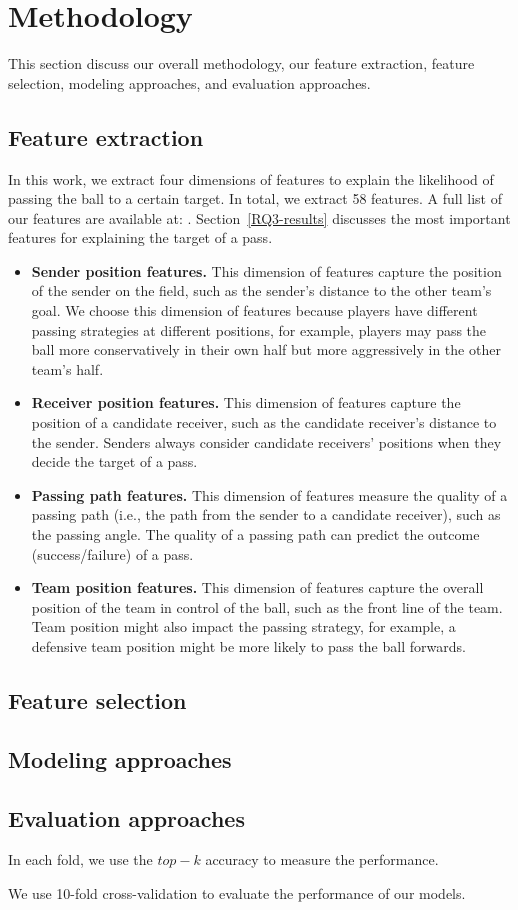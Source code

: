 \section{Methodology} \label{methodology}
This section discuss our overall methodology, our feature extraction, feature selection, modeling approaches, and evaluation approaches.

\subsection{Feature extraction}

In this work, we extract four dimensions of features to explain the likelihood of passing the ball to a certain target. In total, we extract 58 features. A full list of our features are available at: . Section~\ref{RQ3-results} discusses the most important features for explaining the target of a pass.
\begin{itemize}
	\item \textbf{Sender position features.} This dimension of features capture the position of the sender on the field, such as the sender's distance to the other team's goal. We choose this dimension of features because players have different passing strategies at different positions, for example, players may pass the ball more conservatively in their own half but more aggressively in the other team's half.
	\item \textbf{Receiver position features.} This dimension of features capture the position of a candidate receiver, such as the candidate receiver's distance to the sender. Senders always consider candidate receivers' positions when they decide the target of a pass.
	\item \textbf{Passing path features.} This dimension of features measure the quality of a passing path (i.e., the path from the sender to a candidate receiver), such as the passing angle. The quality of a passing path can predict the outcome (success/failure) of a pass.
	\item \textbf{Team position features.} This dimension of features capture the overall position of the team in control of the ball, such as the front line of the team. Team position might also impact the passing strategy, for example, a defensive team position might be more likely to pass the ball forwards.
\end{itemize}

\subsection{Feature selection}

\subsection{Modeling approaches}



\subsection{Evaluation approaches}

In each fold, we use the $top-k$ accuracy to measure the performance.

We use 10-fold cross-validation to evaluate the performance of our models. 
